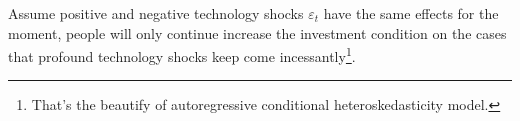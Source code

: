 \documentclass[12pt]{article}
\theoremstyle{definition}
\numberwithin{equation}{section}
\numberwithin{figure}{section}
\numberwithin{table}{section}
\begin{document}
Assume positive and negative technology shocks $\varepsilon_t$ have the same effects for the moment, people will only continue increase the investment condition on the cases that profound technology shocks keep come incessantly\footnote{That's the beautify of autoregressive conditional heteroskedasticity model.}.















\newpage


\end{document}
